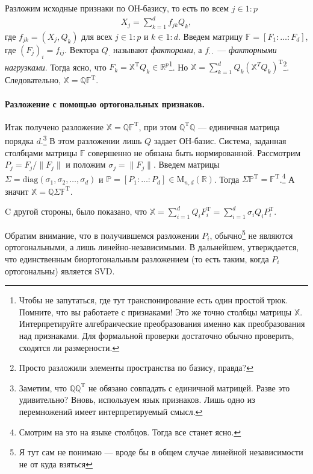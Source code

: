 Разложим исходные признаки по ОН-базису, то есть по всем $j \in 1:p$
\begin{gather*}
    X_j = \sum_{k=1}^d f_{jk} Q_k,
\end{gather*}
где $f_{jk} = (X_j, Q_k)$ для всех $j \in 1:p$ и $k \in 1:d$.
Введем матрицу $\mathbb F = [F_1 \colon \ldots \colon F_d]$, где $\left(F_j\right)_i = f_{ij}$. Вектора $Q_\cdot$ называют \textit{факторами},
а $f_{\cdot \cdot}$ --- \textit{факторными нагрузками}.
Тогда ясно, что $F_k = \mathbb X^\mathrm T Q_k \in \mathbb R^p$\footnote{Чтобы не запутаться, где тут транспонирование есть один простой трюк.
    Помните, что вы работаете с признаками! Это же точно столбцы матрицы $\mathbb X$. Интерпретируйте алгебраические преобразования именно как преобразования над
    признаками. Для формальной проверки достаточно обычно проверить, сходятся ли размерности.}.
    Но $\mathbb X = \sum_{k=1}^d Q_k (\mathbb X^T Q_k)^\mathrm T$\footnote{Просто разложили элементы пространства по базису, правда?}.
Следовательно, $\mathbb X = \mathbb Q \mathbb F^\mathrm T$.

\paragraph{Разложение с помощью ортогональных признаков.}
Итак получено разложение $\mathbb X = \mathbb Q \mathbb F^\mathrm T$, при этом $\mathbb Q^\mathrm T \mathbb Q$ --- единичная матрица порядка $d$.\footnote{Заметим,
    что $\mathbb Q \mathbb Q^\mathrm T$ не обязано совпадать с единичной матрицей. Разве это удивительно? Вновь, используем язык признаков.
    Лишь одно из перемножений имеет интерпретируемый смысл.}
В этом разложении лишь $Q$ задает ОН-базис. Система, заданная столбцами матрицы $\mathbb F$ совершенно не обязана быть нормированной.
Рассмотрим $P_j = F_j / \|F_j\|$ и положим $\sigma_j = \|F_j\|$. Введем матрицы $\Sigma = \mathrm {diag} (\sigma_1, \sigma_2, \ldots, \sigma_d)$ и
$\mathbb P = [P_1 \colon \ldots \colon P_d] \in \mathrm M_{n, d}(\mathbb R)$.
Тогда $\Sigma \mathbb P^\mathrm T = \mathbb F^\mathrm T$.\footnote{Смотрим на это на языке столбцов. Тогда все станет ясно.} 
А значит $\mathbb X = \mathbb Q \Sigma \mathbb F^\mathrm T$.

C другой стороны, было показано, что $\mathbb X = \sum_{i=1}^d Q_i F_i^\mathrm T = \sum_{i=1}^d \sigma_i Q_i P_i^\mathrm T$.

\bigskip

Обратим внимание, что в получившемся разложении $P_i$, обычно\footnote{\color{blue} Я тут сам не понимаю --- вроде бы в общем случае линейной независимости не от куда взяться}
не являются ортогональными, а лишь линейно-независимыми. В дальнейшем, утверждается, что единственным биортогональным разложением (то есть таким, когда $P_i$ ортогональны) является SVD.

